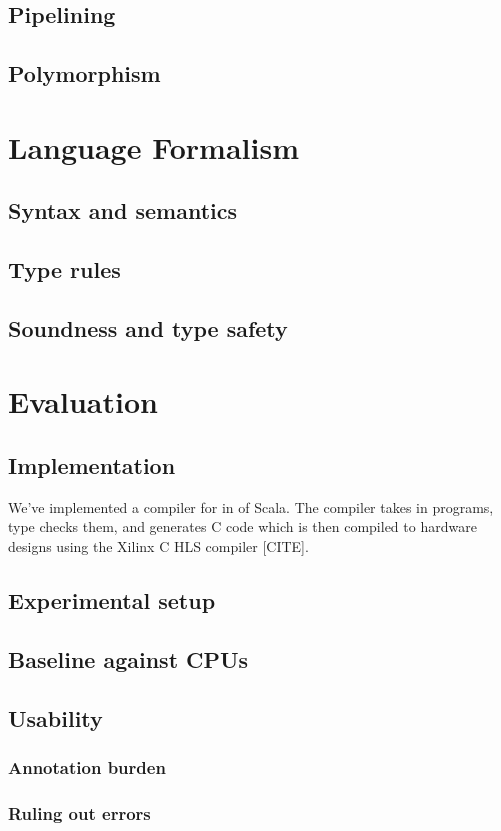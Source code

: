 \documentclass[acmsmall,review,anonymous]{acmart}\settopmatter{printfolios=true,printccs=false,printacmref=false}
\begin{document}
\subsection{Pipelining}
\subsection{Polymorphism}

\section{Language Formalism}
\subsection{Syntax and semantics}
\subsection{Type rules}
\subsection{Soundness and type safety}

\section{Evaluation}
\subsection{Implementation}
We've implemented a compiler for \sys{} in \sysloc{} of Scala. The compiler
takes in \sys{} programs, type checks them, and generates C code which is then
compiled to hardware designs using the Xilinx C HLS compiler [CITE].
\subsection{Experimental setup}
\subsection{Baseline against CPUs}
\subsection{Usability}
\subsubsection{Annotation burden}
\subsubsection{Ruling out errors}
\end{document}

